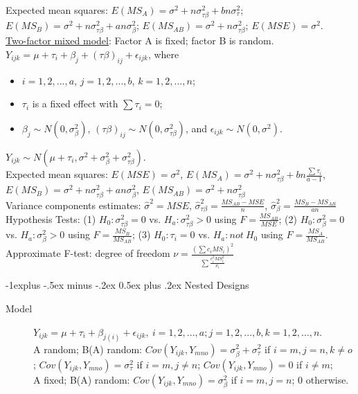 \documentclass[10pt,landscape]{article}
\makeatletter
\renewcommand{\subsection}{\@startsection{subsection}{2}{0mm}%
                                {-1explus -.5ex minus -.2ex}%
                                {0.5ex plus .2ex}%
                                {\normalfont\normalsize\bfseries}}
\makeatother
\begin{document}
\begin{multicols}{3}
\begin{description}
Expected mean squares: $E(MS_A) = \sigma^2 + n\sigma_{\tau \beta}^2 + bn\sigma_{\tau}^2$; $E(MS_B) = \sigma^2 + n\sigma_{\tau \beta}^2 + an\sigma_{\beta}^2$; $E(MS_{AB}) = \sigma^2 + n\sigma_{\tau \beta}^2$; $E(MSE) = \sigma^2$.\\
\underline{Two-factor mixed model}: Factor A is fixed; factor B is random. $Y_{ijk} = \mu + \tau_i + \beta_j + (\tau \beta)_{ij} + \epsilon_{ijk}$, where
\begin{itemize}
	\item $i = 1,2,...,a$, $j = 1,2,...,b$, $k = 1,2,...,n$;
	\item $\tau_i$ is a fixed effect with $\sum \tau_i = 0$;
	\item  $\beta_j \sim N(0, \sigma_\beta ^2)$, $(\tau\beta)_{ij} \sim N(0, \sigma_{\tau\beta}^2)$, and $\epsilon_{ijk} \sim N(0, \sigma^2)$.
\end{itemize}
 $Y_{ijk} \sim N(\mu + \tau_i, \sigma^2 + \sigma_\beta	^2 + \sigma_{\tau\beta}^2)$. \\
Expected mean squares: $E(MSE) = \sigma^2$, $E(MS_A) = \sigma^2 + n\sigma_{\tau\beta}^2 + bn\frac{\sum \tau_i}{a-1}$, $E(MS_B) = \sigma^2 + n\sigma_{\tau\beta}^2 + an\sigma_\beta^2$, $E(MS_{AB}) = \sigma^2 + n\sigma_{\tau\beta}^2$\\
Variance components estimates: $\hat{\sigma}^2 = MSE$, $\hat{\sigma}_{\tau\beta}^2 = \frac{MS_{AB} - MSE}{n}$, $\hat{\sigma}_{\beta}^2 = \frac{MS_{B} - MS_{AB}}{an}$ \\
Hypothesis Tests: (1) $H_0: \sigma_{\tau\beta}^2 = 0$ vs. $H_a: \sigma_{\tau\beta}^2 > 0$ using $F = \frac{MS_{AB}}{MSE}$; (2) $H_0: \sigma_{\beta}^2 = 0$ vs. $H_a: \sigma_{\beta}^2 > 0$ using $F = \frac{MS_{B}}{MS_{AB}}$; (3) $H_0: \tau_i = 0$ vs. $H_a: not\ H_0$ using $F = \frac{MS_{A}}{MS_{AB}}$. \\
Approximate F-test: degree of freedom $\nu = \frac{(\sum c_i MS_i)^2}{\sum \frac{c_i^2 MS_i^2}{\nu_i}}$
\end{description}

\subsection{Nested Designs}

\begin{description}
\item[Model] $Y_{ijk} = \mu + \tau_i + \beta_{j(i)} +  \epsilon_{ijk},\ i = 1,2,...,a; j = 1, 2,...,b, k= 1,2,...,n$. \\
A random; B(A) random: $Cov(Y_{ijk}, Y_{mno}) = \sigma_\beta^2 + \sigma_\tau^2$ if $i=m, j=n, k\neq o$; $Cov(Y_{ijk}, Y_{mno}) =  \sigma_\tau^2$ if $i=m, j\neq n$; $Cov(Y_{ijk}, Y_{mno}) = 0$ if $i\neq m$; \\
A fixed; B(A) random: $Cov(Y_{ijk}, Y_{mno}) = \sigma_\beta^2 $ if $i=m, j=n$; $0$ otherwise.
\end{description}


\end{multicols}
\end{document}
